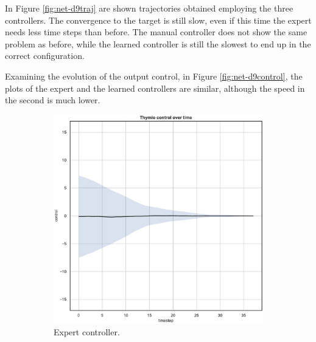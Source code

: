 In Figure \ref{fig:net-d9traj} are shown trajectories obtained employing the three 
controllers. The convergence to the target is still slow, even if this time the expert 
needs less time steps than before. 
The manual controller does not show the same problem as before, while the 
learned controller is still the slowest to end up in the correct configuration.

Examining the evolution of the output control, in Figure \ref{fig:net-d9control}, 
the plots of the expert and the learned controllers are similar, although the speed 
in the second is much lower.
\begin{figure}[!htb]
	\centering
	\begin{subfigure}[h]{0.3\textwidth}
		\centering
		\includegraphics[width=\textwidth]{contents/images/net-d9/control-overtime-omniscient}%
		\caption{Expert controller.}
	\end{subfigure}
	\hfill
	\begin{subfigure}[h]{0.3\textwidth}
		\centering

\end{subfigure}
\end{figure}
